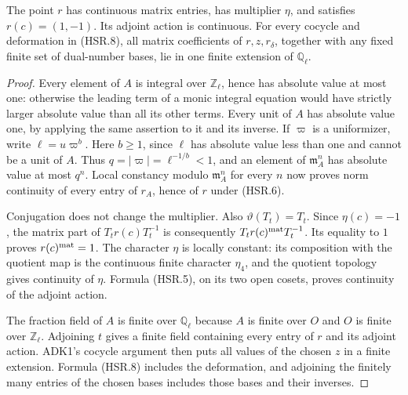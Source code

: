 \begin{lemma}
\label{claim:HSR1}
The point $r$ has continuous matrix entries, has multiplier $\eta$,
and satisfies $r(c)=(1,-1)$.  Its adjoint action is continuous.
For every cocycle and deformation in (HSR.8), all matrix coefficients
of $r,z,r_\delta$, together with any fixed finite set of dual-number
bases, lie in one finite extension of $\mathbb Q_\ell$.
\end{lemma}
\begin{proof}
Every element of $A$ is integral over $\mathbb Z_\ell$, hence has
absolute value at most one: otherwise the leading term of a monic
integral equation would have strictly larger absolute value than
all its other terms.  Every unit of $A$ has absolute value one,
by applying the same assertion to it and its inverse.  If $\varpi$
is a uniformizer, write $\ell=u\varpi^b$.  Here $b\ge1$, since
$\ell$ has absolute value less than one and cannot be a unit of
$A$.  Thus $q=|\varpi|=\ell^{-1/b}<1$, and an element of
$\mathfrak m_A^n$ has absolute value at most $q^n$.  Local constancy
modulo $\mathfrak m_A^n$ for every $n$ now proves norm continuity
of every entry of $r_A$, hence of $r$ under (HSR.6).

Conjugation does not change the multiplier.  Also
$\vartheta(T_t)=T_t$.  Since $\eta(c)=-1$, the matrix part of
$T_t r(c)T_t^{-1}$ is consequently
$T_t r(c)^{\rm mat}T_t^{-1}$.  Its equality to $1$ proves
$r(c)^{\rm mat}=1$.  The character $\eta$ is locally constant:
its composition with the quotient map is the continuous finite
character $\eta_4$, and the quotient topology gives continuity of
$\eta$.  Formula (HSR.5), on its two open cosets, proves continuity
of the adjoint action.

The fraction field of $A$ is finite over $\mathbb Q_\ell$ because
$A$ is finite over $O$ and $O$ is finite over $\mathbb Z_\ell$.
Adjoining $t$ gives a finite field containing every entry of $r$ and
its adjoint action.  ADK1's cocycle argument then puts all values of
the chosen $z$ in a finite extension.  Formula (HSR.8) includes the
deformation, and adjoining the finitely many entries of the chosen
bases includes those bases and their inverses.


\end{proof}
